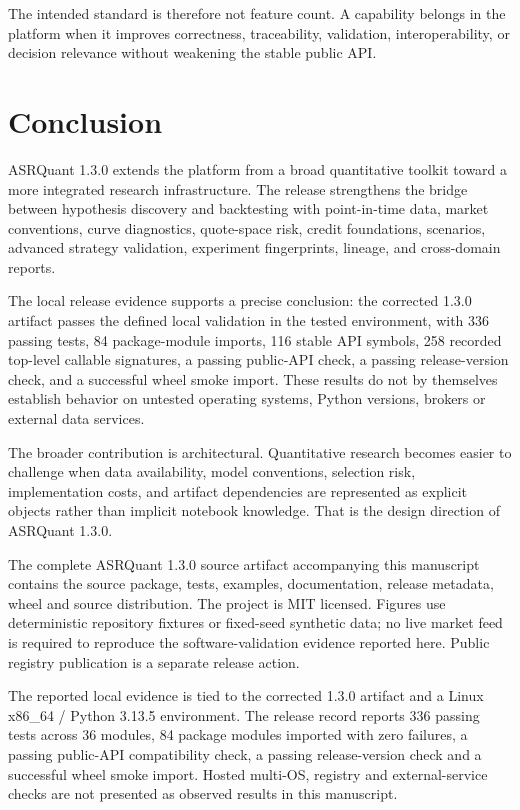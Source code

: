 \documentclass{asrpaper}
\begin{document}
The intended standard is therefore not feature count. A capability belongs in the platform when it improves correctness, traceability, validation, interoperability, or decision relevance without weakening the stable public API.

\section{Conclusion}
ASRQuant 1.3.0 extends the platform from a broad quantitative toolkit toward a more integrated research infrastructure. The release strengthens the bridge between hypothesis discovery and backtesting with point-in-time data, market conventions, curve diagnostics, quote-space risk, credit foundations, scenarios, advanced strategy validation, experiment fingerprints, lineage, and cross-domain reports.

The local release evidence supports a precise conclusion: the corrected 1.3.0 artifact passes the defined local validation in the tested environment, with 336 passing tests, 84 package-module imports, 116 stable API symbols, 258 recorded top-level callable signatures, a passing public-API check, a passing release-version check, and a successful wheel smoke import. These results do not by themselves establish behavior on untested operating systems, Python versions, brokers or external data services.

The broader contribution is architectural. Quantitative research becomes easier to challenge when data availability, model conventions, selection risk, implementation costs, and artifact dependencies are represented as explicit objects rather than implicit notebook knowledge. That is the design direction of ASRQuant 1.3.0.

{\small The complete ASRQuant 1.3.0 source artifact accompanying this manuscript contains the source package, tests, examples, documentation, release metadata, wheel and source distribution. The project is MIT licensed. Figures use deterministic repository fixtures or fixed-seed synthetic data; no live market feed is required to reproduce the software-validation evidence reported here. Public registry publication is a separate release action.}

{\small The reported local evidence is tied to the corrected 1.3.0 artifact and a Linux x86\_64 / Python 3.13.5 environment. The release record reports 336 passing tests across 36 modules, 84 package modules imported with zero failures, a passing public-API compatibility check, a passing release-version check and a successful wheel smoke import. Hosted multi-OS, registry and external-service checks are not presented as observed results in this manuscript.}
\end{document}
